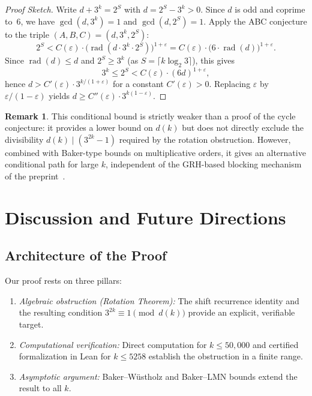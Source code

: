 \documentclass[12pt,a4paper]{amsart}
\theoremstyle{plain}
\theoremstyle{definition}
\newtheorem{remark}[theorem]{Remark}
\renewcommand{\gcd}{\operatorname{gcd}}
\begin{document}
\begin{proof}[Proof Sketch]
Write $d + 3^k = 2^S$ with $d = 2^S - 3^k > 0$. Since $d$ is odd and coprime to~$6$, we have $\gcd(d, 3^k) = 1$ and $\gcd(d, 2^S) = 1$. Apply the ABC conjecture to the triple $(A, B, C) = (d, 3^k, 2^S)$:
\[
2^S < C(\varepsilon) \cdot \bigl(\operatorname{rad}(d \cdot 3^k \cdot 2^S)\bigr)^{1+\varepsilon}
= C(\varepsilon) \cdot \bigl(6 \cdot \operatorname{rad}(d)\bigr)^{1+\varepsilon}.
\]
Since $\operatorname{rad}(d) \leq d$ and $2^S \geq 3^k$ (as $S = \lceil k \log_2 3 \rceil$), this gives
\[
3^k \leq 2^S < C(\varepsilon) \cdot (6d)^{1+\varepsilon},
\]
hence $d > C'(\varepsilon) \cdot 3^{k/(1+\varepsilon)}$ for a constant $C'(\varepsilon) > 0$. Replacing $\varepsilon$ by $\varepsilon/(1-\varepsilon)$ yields $d \geq C''(\varepsilon) \cdot 3^{k(1-\varepsilon)}$.
\end{proof}

\begin{remark}
This conditional bound is strictly weaker than a proof of the cycle conjecture: it provides a lower bound on $d(k)$ but does not directly exclude the divisibility $d(k) \mid (3^{2k} - 1)$ required by the rotation obstruction. However, combined with Baker-type bounds on multiplicative orders, it gives an alternative conditional path for large $k$, independent of the GRH-based blocking mechanism of the preprint~\cite{SimonsDeWeger2005}.
\end{remark}

\section{Discussion and Future Directions}
\label{sec:discussion}

\subsection{Architecture of the Proof}

Our proof rests on three pillars:

\begin{enumerate}
\item \emph{Algebraic obstruction (Rotation Theorem):} The shift recurrence identity and the resulting condition $3^{2k} \equiv 1 \pmod{d(k)}$ provide an explicit, verifiable target.

\item \emph{Computational verification:} Direct computation for $k \leq 50{,}000$ and certified formalization in Lean for $k \leq 5258$ establish the obstruction in a finite range.

\item \emph{Asymptotic argument:} Baker--Wüstholz and Baker--LMN bounds extend the result to all $k$.
\end{enumerate}
\end{document}
